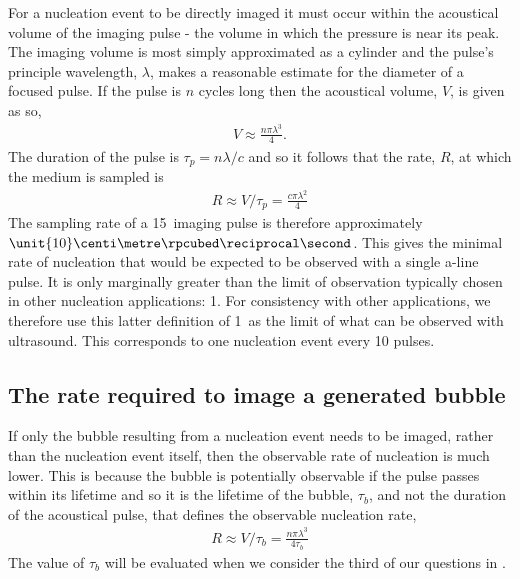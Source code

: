 For a nucleation event to be directly imaged
it must occur within the acoustical volume of the imaging pulse -
the volume in which the pressure is near its peak.
%
The imaging volume is most simply approximated as a cylinder
and the pulse's principle wavelength, $\lambda$, makes a reasonable estimate for the diameter of a focused pulse.
If the pulse is $n$ cycles long then the acoustical volume, $V$, is given as so,
\begin{align}
  V \approx \frac{n  \pi \lambda^3 }{ 4}.
\end{align}
The duration of the pulse is $\tau_p=n\lambda/c$ and so it follows that the rate, $R$, at which the medium is sampled is 
\begin{align}
R \approx V/\tau_p = \frac{c\pi\lambda^2 }{4}
\label{eqn:nuc:rateOne}
\end{align}
The sampling rate of a \unit{15}\mega\hertz\ imaging pulse is therefore approximately
$\unit{10}\centi\metre\rpcubed\reciprocal\second$.
This gives the minimal rate of nucleation that would  be expected to be observed with a single a-line pulse.
It is only marginally greater than the limit of observation typically chosen in other nucleation applications: \unit{1}\centi\metre \rpcubed\reciprocal\second \cite{HongChul2005}.
For consistency with other applications, we therefore use this latter definition of  \unit{1}\centi\metre \rpcubed\reciprocal\second\
as the limit of what can be observed with ultrasound.
This corresponds to one nucleation event every 10 pulses.



\subsection{The rate required to image a generated bubble}

If only the bubble resulting from a nucleation event needs to be imaged, rather than the nucleation event itself, 
then the observable rate of nucleation is much lower.
This is because the bubble is potentially observable if the pulse passes within its lifetime 
and so it is the lifetime of the bubble, $\tau_b$, and not the duration of the acoustical pulse,
that defines the observable nucleation rate,
\begin{align}
R\approx V/\tau_b = \frac{n\pi\lambda^3}{4\tau_b}
\label{eqn:observable_rate_lifetime}
\end{align}
The value of $\tau_b$ will be evaluated when we consider the third of our questions in  .



